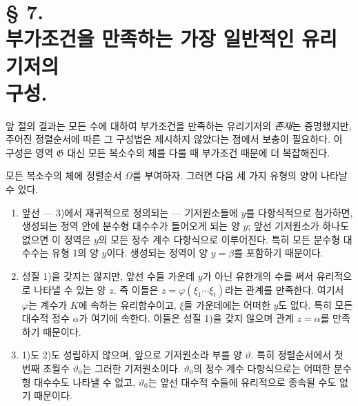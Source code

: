 \section*{\centering § 7.\\[0.35em]
부가조건을 만족하는 가장 일반적인 유리기저의\\
구성.}

앞 절의 결과는 모든 수에 대하여 부가조건을 만족하는 유리기저의 \emph{존재}는 증명했지만, 주어진 정렬순서에 따른 그 구성법은 제시하지 않았다는 점에서 보충이 필요하다. 이 구성은 영역 $\mathfrak G$ 대신 모든 복소수의 체를 다룰 때 부가조건 때문에 더 복잡해진다.

모든 복소수의 체에 정렬순서 $\Omega$를 부여하자. 그러면 다음 세 가지 유형의 양이 나타날 수 있다.
\begin{enumerate}
\item[1.] 앞선 --- 3)에서 재귀적으로 정의되는 --- 기저원소들에 $y$를 다항식적으로 첨가하면, 생성되는 정역 안에 분수형 대수수가 들어오게 되는 양 $y$; 앞선 기저원소가 하나도 없으면 이 정역은 $y$의 모든 정수 계수 다항식으로 이루어진다. 특히 모든 분수형 대수수는 유형 1의 양 $y$이다. 생성되는 정역이 양 $y=\beta$를 포함하기 때문이다.
\item[2.] 성질 1)을 갖지는 않지만, 앞선 수들 가운데 $y$가 아닌 유한개의 수를 써서 유리적으로 나타낼 수 있는 양 $z$. 즉 이들은
$z=\varphi(\xi_1\cdots\xi_t)$라는 관계를 만족한다. 여기서 $\varphi$는 계수가 $K$에 속하는 유리함수이고, $\xi$들 가운데에는 어떠한 $y$도 없다. 특히 모든 대수적 정수 $\alpha$가 여기에 속한다. 이들은 성질 1)을 갖지 않으며 관계 $z=\alpha$를 만족하기 때문이다.
\item[3.] 1)도 2)도 성립하지 않으며, 앞으로 기저원소라 부를 양 $\vartheta$. 특히 정렬순서에서 첫 번째 초월수 $\vartheta_0$는 그러한 기저원소이다. $\vartheta_0$의 정수 계수 다항식으로는 어떠한 분수형 대수수도 나타낼 수 없고, $\vartheta_0$는 앞선 대수적 수들에 유리적으로 종속될 수도 없기 때문이다.
\end{enumerate}

